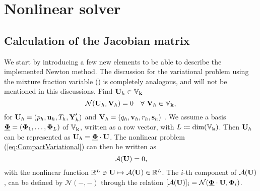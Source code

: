\section{Nonlinear solver}

\subsection{Calculation of the Jacobian matrix}
We start by introducing a few new elements to be able to describe the implemented Newton method.
The discussion for the variational problem using the mixture fraction variable () is completely analogous, and will not be mentioned in this discussions.
Find $\textbf{U}_h \in \mathbb{V}_{\textbf{k}}$
\begin{equation}
	\mathcal{N}(\textbf{U}_h,\textbf{V}_h) = 0 \quad \forall \ \textbf{V}_h \in \mathbb{V}_{\textbf{k}} ,
	\label{eq:CompactVariational}
\end{equation}
for
$\textbf{U}_h = (p_h,\textbf{u}_h, T_h, \textbf{Y}'_h)$ and
$\textbf{V}_h = (q_h,\textbf{v}_h, r_h, \mathbf{s}_h)$
. We assume a basis
$\underline{\boldsymbol{\Phi}} = ( \boldsymbol{\Phi}_1, \ldots , \boldsymbol{\Phi}_L )$ of $\mathbb{V}_{\textbf{k}}$,
written as a row vector, with $L \coloneqq \textrm{dim}(\mathbb{V}_{\textbf{k}})$.
Then $\textbf{U}_h$ can be represented as
$ \textbf{U}_h =  \underline{ \boldsymbol{\Phi} } \cdot \textbf{U} $.
The nonlinear problem (\ref{eq:CompactVariational}) can then be written as
\begin{equation}
	\mathcal{A}(\textbf{U}) = 0 ,
	\label{Eq:nonLinSystem}
\end{equation}
with the nonlinear function
$\mathbb{R}^L \ni \textbf{U} \mapsto \mathcal{A}(\textbf{U}) \in \mathbb{R}^L$.
The $i$-th component of $ \mathcal{A}(\textbf{U})$, can be defined by $\mathcal{N}(-,-)$ through the relation
$[\mathcal{A}(\textbf{U})]_i = \mathcal{N}( \underline{ \boldsymbol{\Phi} } \cdot \textbf{U} , \boldsymbol{\Phi}_i)$.

